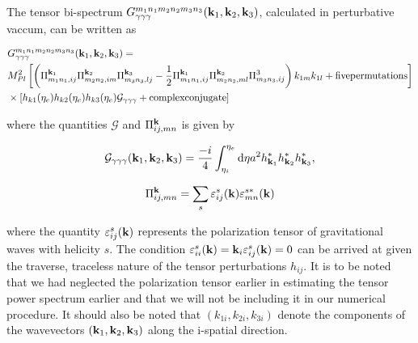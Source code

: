 \documentclass[12pt,a4paper,oneside]{book}
\begin{document}
\paragraph*{} The tensor bi-spectrum $G_{\gamma\gamma\gamma}^{m_1n_1m_2n_2m_3n_3}({\bf k}_1, {\bf k}_2, {\bf k}_3)$,
calculated in perturbative vaccum, can be written as \cite{Maldacena, 32, Pi-2, 56}

\begin{align*}\label{eq:G}
& G_{\gamma\gamma\gamma}^{m_1n_1m_2n_2m_3n_3}({\bf k}_1, {\bf k}_2, {\bf k}_3) = \\
& M_{Pl}^2\left[\left(
\Pi^{{\bf k}_1}_{m_1n_1,ij}\Pi^{{\bf k}_2}_{m_2n_2,im}\Pi^{{\bf k}_3}_{m_3n_3,lj} 
-\frac{1}{2}\Pi^{{\bf k}_1}_{m_1n_1,ij}\Pi^{{\bf k}_2}_{m_2n_2,ml}\Pi^{3}_{m_3n_3,ij}
\right)k_{1m}k_{1l} + {\rm five} {\rm permutations}\right]\\
& \times\left[h_{k1}(\eta_e)h_{k2}(\eta_e)h_{k3}(\eta_e)\mathcal{G}_{\gamma\gamma\gamma} 
+{\rm complex conjugate}\right]
\end{align*}

\noindent where the quantities $\mathcal{G}$ and $\Pi^{{\bf k}}_{ij,mn}$ is 
given by \cite{Pi-1, Pi-2}

\begin{equation}\label{eq:calG}
\mathcal{G}_{\gamma\gamma\gamma}({\bf k}_1, {\bf k}_2, {\bf k}_3) = 
\frac{-i}{4}\int^{\eta_e}_{\eta_i}{\rm d}\eta a^2 h_{{\bf k}_1}^*h_{{\bf k}_2}^*h_{{\bf k}_3}^*,
\end{equation}

\begin{equation}
\Pi^{{\bf k}}_{ij,mn}= \sum_{s} \varepsilon^s_{ij}({\bf k})\varepsilon^{s*}_{mn}({\bf k})
\end{equation}

\noindent where the quantity $\varepsilon^s_{ij}({\bf k})$ represents the polarization 
tensor of gravitational waves with helicity $s$. The condition 
$\varepsilon^s_{ii}({\bf k}) = {\bf k}_i\varepsilon^s_{ij}({\bf k}) = 0$ can be arrived at given the 
traverse, traceless nature of the tensor perturbations $h_{ij}$. %
It is to be noted that we had neglected the polarization tensor earlier 
in estimating the tensor power spectrum earlier and 
that we will not be including it in our numerical procedure.
It should also be noted that $(k_{1i}, k_{2i}, k_{3i})$ denote the components of the wavevectors 
$({\bf k}_1, {\bf k}_2, {\bf k}_3)$ along the i-spatial direction.
\end{document}
